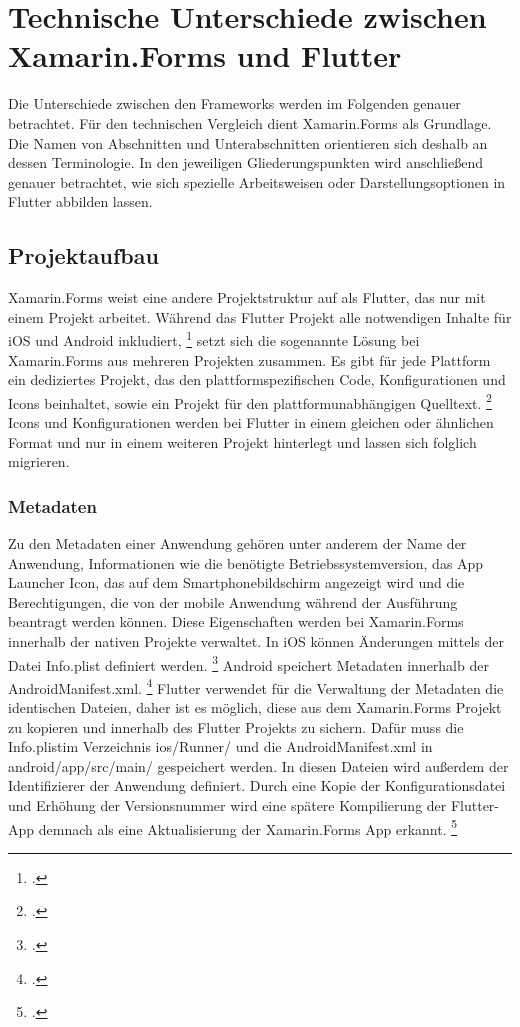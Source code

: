 \chapter{Technische Unterschiede zwischen Xamarin.Forms und Flutter}
\label{chap:CrossPlattformFrameworks}

Die Unterschiede zwischen den Frameworks werden im Folgenden genauer betrachtet.  Für den technischen Vergleich dient Xamarin.Forms als Grundlage.  Die Namen von Abschnitten und Unterabschnitten orientieren sich deshalb an dessen Terminologie.  In den jeweiligen Gliederungspunkten wird anschließend genauer betrachtet,  wie sich spezielle Arbeitsweisen oder Darstellungsoptionen in Flutter abbilden lassen. 

\section{Projektaufbau}
Xamarin.Forms weist eine andere Projektstruktur auf als Flutter,  das nur mit einem Projekt arbeitet.  Während das Flutter Projekt alle notwendigen Inhalte für iOS und Android inkludiert, \footcite[Vgl.][S. 113]{Biessek2019} setzt sich die sogenannte Lösung bei Xamarin.Forms aus mehreren Projekten zusammen.  Es gibt für jede Plattform ein dediziertes Projekt, das den plattformspezifischen Code,  Konfigurationen und Icons beinhaltet, sowie ein Projekt für den plattformunabhängigen Quelltext.   \footcite[Vgl.][S. 25f.]{Petzold2016} Icons und Konfigurationen werden bei Flutter in einem gleichen oder ähnlichen Format und nur in einem weiteren Projekt hinterlegt und lassen sich folglich migrieren.  


\subsection{Metadaten}
Zu den Metadaten einer Anwendung gehören unter anderem der Name der Anwendung,  Informationen wie die benötigte Betriebssystemversion, das \glq App Launcher Icon\grq ,  das auf dem Smartphonebildschirm angezeigt wird und die Berechtigungen,  die von der mobile Anwendung während der Ausführung beantragt werden können.  Diese Eigenschaften werden bei Xamarin.Forms innerhalb der nativen Projekte verwaltet.  In iOS können Änderungen mittels der Datei \glq Info.plist\grq{} definiert werden. \footcite[Vgl.][Abgerufen am \today]{MicrosoftInfoPlist2017} Android speichert Metadaten innerhalb der \glq AndroidManifest.xml\grq{}. \footcite[Vgl.][Abgerufen am \today]{MicrosoftManifest2018} Flutter verwendet für die Verwaltung der Metadaten die identischen Dateien,  daher ist es möglich,  diese aus dem Xamarin.Forms Projekt zu kopieren und innerhalb des Flutter Projekts zu sichern.  Dafür muss die \glq Info.plist\grq im Verzeichnis \glq ios/Runner/\grq{} und die \glq AndroidManifest.xml\grq{}  in \glq android/app/src/main/\grq{} gespeichert werden.  In diesen Dateien wird außerdem der Identifizierer der Anwendung definiert.  Durch eine Kopie der Konfigurationsdatei und Erhöhung der Versionsnummer wird eine spätere Kompilierung der Flutter-App demnach als eine Aktualisierung der Xamarin.Forms App erkannt.  \footcite[Vgl.][Abgerufen am \today]{Rana2020}



